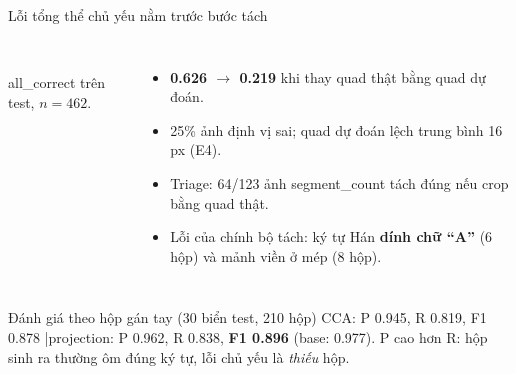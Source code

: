 \documentclass[aspectratio=169,11pt]{beamer}
\newcommand{\code}[1]{{\footnotesize\ttfamily #1}}
\newcommand{\hl}[1]{\textcolor{accentdark}{\textbf{#1}}}
\begin{document}
\begin{frame}{Lỗi tổng thể chủ yếu nằm trước bước tách}
  \begin{columns}[T]
    \\[1mm]
    {\footnotesize\color{muted} \code{all\_correct} trên test, $n=462$.}
    \begin{itemize}
      \item \hl{0.626 $\to$ 0.219} khi thay quad thật bằng quad dự đoán.
      \item 25\% ảnh định vị sai; quad dự đoán lệch trung bình 16 px (E4).
      \item Triage: 64/123 ảnh \code{segment\_count} tách đúng nếu crop bằng quad thật.
      \item Lỗi của chính bộ tách: ký tự Hán \hl{dính chữ ``A''} (6 hộp) và mảnh viền ở mép (8 hộp).
    \end{itemize}
  \end{columns}
  \vspace{1mm}
  \begin{block}{Đánh giá theo hộp gán tay (30 biển test, 210 hộp)}
    \small CCA: P 0.945, R 0.819, F1 0.878 \quad|\quad projection: P 0.962, R 0.838, \hl{F1 0.896} (base: 0.977). P cao hơn R: hộp sinh ra thường ôm đúng ký tự, lỗi chủ yếu là \emph{thiếu} hộp.
  \end{block}
\end{frame}
\end{document}
